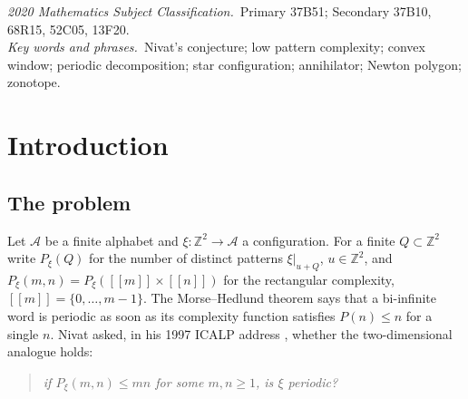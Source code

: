 \documentclass[11pt,reqno]{amsart}
\theoremstyle{plain}
\theoremstyle{definition}
\theoremstyle{remark}
\theoremstyle{plain}
\theoremstyle{remark}
\theoremstyle{definition}
\numberwithin{equation}{section}
\newcommand{\Z}{\mathbb{Z}}
\newcommand{\cA}{\mathcal{A}}
\newcommand{\dbr}[1]{[\![#1]\!]}
\begin{document}
\maketitle

\begin{center}\small
\emph{2020 Mathematics Subject Classification.}\ Primary 37B51;
Secondary 37B10, 68R15, 52C05, 13F20.\\
\emph{Key words and phrases.}\ Nivat's conjecture; low pattern complexity;
convex window; periodic decomposition; star configuration; annihilator;
Newton polygon; zonotope.
\end{center}

\section*{Introduction}

\subsection*{The problem}

Let $\cA$ be a finite alphabet and $\xi\colon\Z^2\to\cA$ a configuration.  For a
finite $Q\subset\Z^2$ write $P_\xi(Q)$ for the number of distinct patterns
$\xi|_{u+Q}$, $u\in\Z^2$, and $P_\xi(m,n)=P_\xi(\dbr{m}\times\dbr{n})$ for the
rectangular complexity, $\dbr{m}=\{0,\dots,m-1\}$.  The Morse--Hedlund theorem
\cite{MH38} says that a bi-infinite word is periodic as soon as its complexity
function satisfies $P(n)\le n$ for a single $n$.  Nivat asked, in his 1997 ICALP
address \cite{Nivat}, whether the two-dimensional analogue holds:

\begin{quote}
\emph{if $P_\xi(m,n)\le mn$ for some $m,n\ge1$, is $\xi$ periodic?}
\end{quote}
\end{document}
